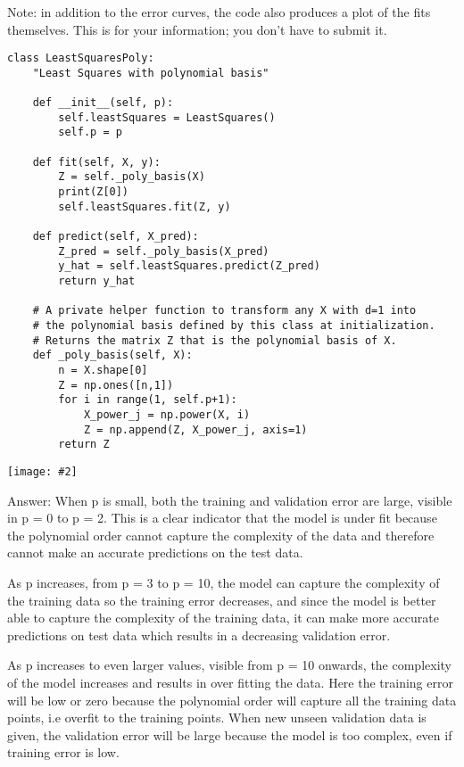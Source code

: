 \documentclass{article}
\newenvironment{answer}{\par\begingroup\color{gre}Answer: }{\endgroup}
\newcommand{\centerfig}[2]{\begin{center}\texttt{[image: \#2]}\end{center}}
\begin{document}
Note: in addition to the error curves, the code also produces a plot of the fits themselves. This is for your information; you don't have to submit it.
\begin{verbatim}
class LeastSquaresPoly:
    "Least Squares with polynomial basis"

    def __init__(self, p):
        self.leastSquares = LeastSquares()
        self.p = p

    def fit(self, X, y):
        Z = self._poly_basis(X)
        print(Z[0])
        self.leastSquares.fit(Z, y)

    def predict(self, X_pred):
        Z_pred = self._poly_basis(X_pred)
        y_hat = self.leastSquares.predict(Z_pred)
        return y_hat

    # A private helper function to transform any X with d=1 into
    # the polynomial basis defined by this class at initialization.
    # Returns the matrix Z that is the polynomial basis of X.
    def _poly_basis(self, X):
        n = X.shape[0]
        Z = np.ones([n,1])
        for i in range(1, self.p+1):
            X_power_j = np.power(X, i)
            Z = np.append(Z, X_power_j, axis=1)
        return Z
\end{verbatim}
\clearpage
\centerfig{.7}{figs/polynomial_error_curves.pdf}
\begin{answer}
When p is small, both the training and validation error are large, visible in p = 0 to p = 2. This is a clear indicator that the model is under fit because the polynomial order cannot capture the complexity of the data and therefore cannot make an accurate predictions on the test data.
    
As p increases, from p = 3 to p = 10, the model can capture the complexity of the training data so the training error decreases, and since the model is better able to capture the complexity of the training data, it can make more accurate predictions on test data which results in a decreasing validation error.
    
As p increases to even larger values, visible from p = 10 onwards, the complexity of the model increases and results in over fitting the data. Here the training error will be low or zero because the polynomial order will capture all the training data points, i.e overfit to the training points. When new unseen validation data is given, the validation error will be large because the model is too complex, even if training error is low.
\end{answer}
\clearpage
\end{document}
